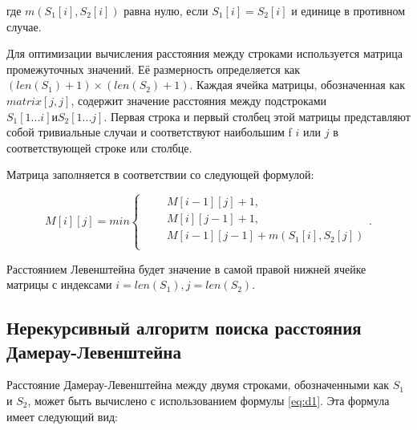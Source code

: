 где $m(S_{1}[i], S_{2}[i])$ равна нулю, если $S_{1}[i] = S_{2}[i]$ и единице в противном случае.

Для оптимизации вычисления расстояния между строками используется матрица промежуточных значений. Её размерность определяется как $(len(S_{1}) + 1) × (len(S_{2}) + 1)$. Каждая ячейка матрицы, обозначенная как $matrix[j, j]$, содержит значение расстояния между подстроками $S_{1}[1...i] и S_{2}[1...j]$. Первая строка и первый столбец этой матрицы представляют собой тривиальные случаи и соответствуют наибольшим f $i$ или $j$ в соответствующей строке или столбце.

Матрица заполняется в соответствии со следующей формулой:

\begin{equation}
	\label{eq:mat}
	M[i][j] = min \begin{cases}
		\qquad M[i-1][j] + 1,\\
		\qquad M[i][j-1] + 1,\\
		\qquad M[i-1][j-1] + m(S_{1}[i], S_{2}[j])\\
	\end{cases}.
\end{equation}

Расстоянием Левенштейна будет значение в самой правой нижней ячейке матрицы с индексами $i = len(S_{1}), j = len(S_{2})$.

\subsection{Нерекурсивный алгоритм поиска расстояния Дамерау-Левенштейна}

Расстояние Дамерау-Левенштейна между двумя строками, обозначенными как $S_1$ и $S_2$, может быть вычислено с использованием формулы \ref{eq:d1}. Эта формула имеет следующий вид:

